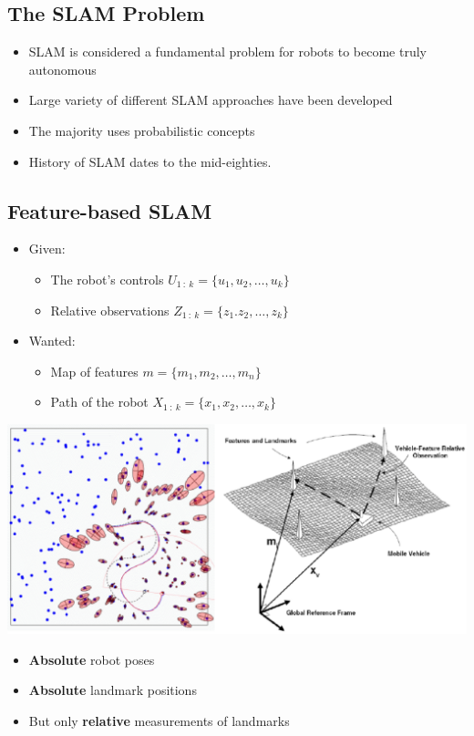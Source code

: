 \documentclass[10pt]{article}
\begin{document}
\subsection*{The SLAM Problem}
\begin{itemize}
	\item SLAM is considered a fundamental problem for robots to become truly autonomous
	\item Large variety of different SLAM approaches have been developed
	\item The majority uses probabilistic concepts
	\item History of SLAM dates to the mid-eighties.
\end{itemize}

\subsection*{Feature-based SLAM}
\begin{itemize}
	\item Given:
	\begin{itemize}
        \item The robot's controls $U_{1\::\: k} = \{u_1, u_2, \dots, u_k\}$
        \item Relative observations $Z_{1\::\: k} = \{z_1. z_2, \dots, z_k\}$
    \end{itemize}
	\item Wanted:
	\begin{itemize}
        \item Map of features $m = \{m_1, m_2, \dots, m_n\}$
        \item Path of the robot $X_{1\::\: k} = \{x_1, x_2, \dots, x_k\}$
    \end{itemize}
\end{itemize}
\begin{center} 
	\includegraphics*[width=\textwidth]{L2_1.png} 
\end{center}
\begin{itemize}
	\item \textbf{Absolute} robot poses
	\item \textbf{Absolute} landmark positions
	\item But only \textbf{relative} measurements of landmarks
\end{itemize}
\end{document}
